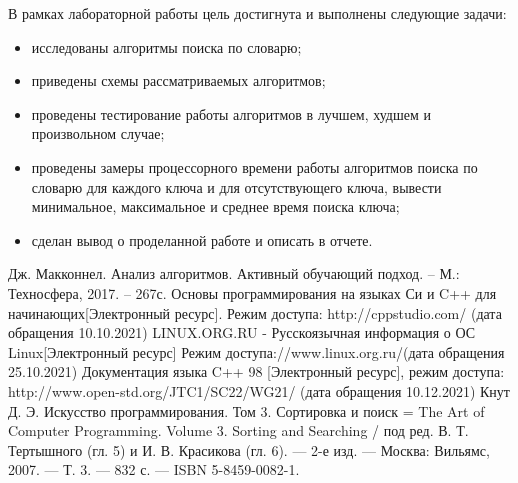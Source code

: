 \documentclass[12pt,a4paper]{report}
\begin{document}
В рамках лабораторной работы цель достигнута и выполнены следующие задачи:

\begin{itemize}
	\item исследованы алгоритмы поиска по словарю;
	\item приведены схемы рассматриваемых алгоритмов;
	\item проведены тестирование работы алгоритмов в лучшем, худшем и произвольном случае;
	\item проведены замеры процессорного времени работы алгоритмов поиска по словарю для каждого ключа и для отсутствующего ключа, вывести минимальное, максимальное и среднее время поиска ключа;
	\item сделан вывод о проделанной работе и описать в отчете.
\end{itemize}
	
	
\newpage
\renewcommand\bibname{Список литературы}
\makeatletter %
\def\@biblabel#1{#1. }
\makeatother
\begin{thebibliography}{2}
	 Дж. Макконнел. Анализ алгоритмов. Активный обучающий подход. -- М.: Техносфера, 2017. -- 267с.
	Основы программирования на языках Си и C++ для начинающих[Электронный ресурс]. Режим доступа: http://cppstudio.com/ (дата обращения 10.10.2021)
	LINUX.ORG.RU - Русскоязычная информация о ОС Linux[Электронный ресурс] Режим доступа://www.linux.org.ru/(дата обращения 25.10.2021)
	  Документация языка C++ 98 [Электронный ресурс], режим доступа: http://www.open-std.org/JTC1/SC22/WG21/ (дата обращения 10.12.2021)
	Кнут Д. Э. Искусство программирования. Том 3. Сортировка и поиск = The Art of Computer Programming. Volume 3. Sorting and Searching / под ред. В. Т. Тертышного (гл. 5) и И. В. Красикова (гл. 6). — 2-е изд. — Москва: Вильямс, 2007. — Т. 3. — 832 с. — ISBN 5-8459-0082-1.
	
\end{thebibliography}
\end{document}
